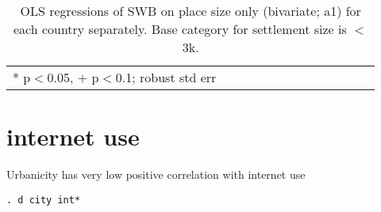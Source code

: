 \documentclass[10pt, letterpaper]{article}
\begin{document}
\begin{spacing}{1.4}
\begin{spacing}{.9} \begin{table}[H]\centering   \begin{scriptsize} \begin{tabular}{p{.5in}p{.5in}p{.5in}p{.5in}p{.5in}p{.5in}p{.5in}p{.5in}p{.5in}p{.5in}p{.5
                                                                      in}p{.5in}p{.5
                                                                      in}}\hline
                                                                      
                                                                      \hline *
                                                                      p$<$0.05,
                                                                      $+$
                                                                      p$<$0.1;
                                                                      robust std
                                                                      err \end{tabular}\end{scriptsize}\caption{\label{d1}OLS
                                                                    regressions
                                                                    of SWB on
                                                                    place size
                                                                    only
                                                                    (bivariate; a1)
                                                                    for each
                                                                    country
                                                                    separately. Base category for settlement size is $<$3k.
                                                                  }\end{table} \end{spacing}


\section{internet use}

Urbanicity has very low positive correlation with internet use

\begin{spacing}{.5}
\begin{scriptsize}
\begin{verbatim}
. d city int*


\end{verbatim}
\end{scriptsize}
\end{spacing}
\end{spacing}
\end{document}
